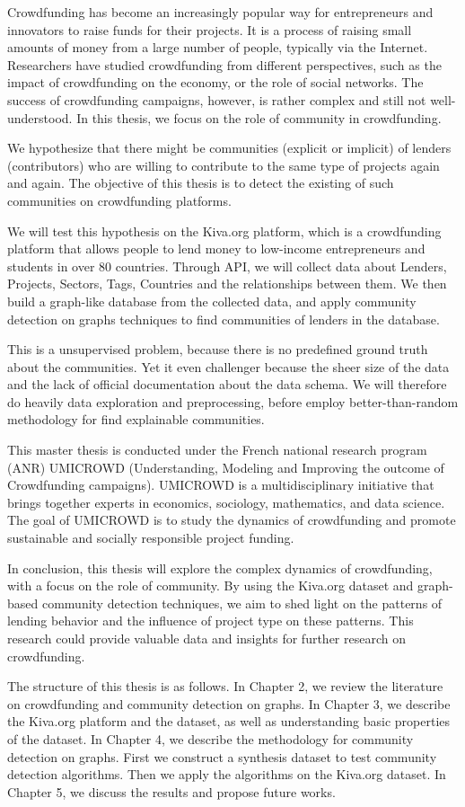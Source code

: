 Crowdfunding has become an increasingly popular way for entrepreneurs and innovators to raise funds for their projects.
It is a process of raising small amounts of money from a large number of people, typically via the Internet.
Researchers have studied crowdfunding from different perspectives, such as the impact of crowdfunding on the economy, or the role of social networks.
The success of crowdfunding campaigns, however, is rather complex and still not well-understood.
In this thesis, we focus on the role of community in crowdfunding.

We hypothesize that there might be communities (explicit or implicit) of lenders (contributors) who are willing to contribute to the same type of projects again and again.
The objective of this thesis is to detect the existing of such communities on crowdfunding platforms.

We will test this hypothesis on the Kiva.org platform,
which is a crowdfunding platform that allows people to lend money to low-income entrepreneurs and students in over 80 countries.
Through API, we will collect data about Lenders, Projects, Sectors, Tags, Countries and the relationships between them.
We then build a graph-like database from the collected data,
and apply community detection on graphs techniques to find communities of lenders in the database.

This is a unsupervised problem, because there is no predefined ground truth about the communities.
Yet it even challenger because the sheer size of the data and the lack of official documentation about the data schema.
We will therefore do heavily data exploration and preprocessing,
before employ better-than-random methodology for find explainable communities.

This master thesis is conducted under the French national research program (ANR) UMICROWD (Understanding, Modeling and Improving the outcome of Crowdfunding campaigns).
UMICROWD is a multidisciplinary initiative that brings together experts in economics, sociology, mathematics, and data science.
The goal of UMICROWD is to study the dynamics of crowdfunding and promote sustainable and socially responsible project funding.

In conclusion, this thesis will explore the complex dynamics of crowdfunding, with a focus on the role of community.
By using the Kiva.org dataset and graph-based community detection techniques,
we aim to shed light on the patterns of lending behavior and the influence of project type on these patterns.
This research could provide valuable data and insights for further research on crowdfunding.

The structure of this thesis is as follows.
In Chapter 2, we review the literature on crowdfunding and community detection on graphs.
In Chapter 3, we describe the Kiva.org platform and the dataset,
as well as understanding basic properties of the dataset.
In Chapter 4, we describe the methodology for community detection on graphs.
First we construct a synthesis dataset to test community detection algorithms.
Then we apply the algorithms on the Kiva.org dataset.
In Chapter 5, we discuss the results and propose future works.
